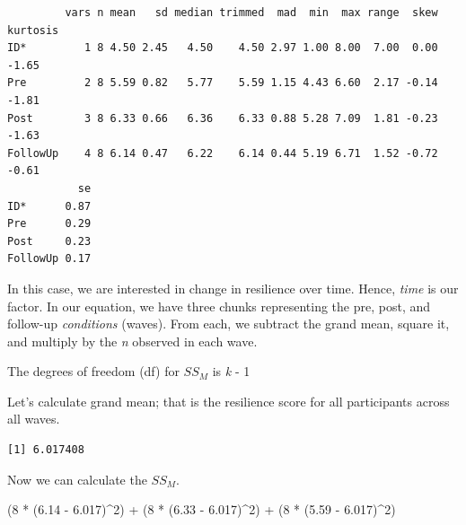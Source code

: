 \documentclass[
  11pt,
]{book}
\newenvironment{Shaded}{\begin{snugshade}}{\end{snugshade}}
\newcommand{\DecValTok}[1]{\textcolor[rgb]{0.00,0.00,0.81}{#1}}
\newcommand{\FloatTok}[1]{\textcolor[rgb]{0.00,0.00,0.81}{#1}}
\newcommand{\FunctionTok}[1]{\textcolor[rgb]{0.00,0.00,0.00}{#1}}
\newcommand{\NormalTok}[1]{#1}
\newcommand{\SpecialCharTok}[1]{\textcolor[rgb]{0.00,0.00,0.00}{#1}}
\begin{document}
\begin{verbatim}
         vars n mean   sd median trimmed  mad  min  max range  skew kurtosis
ID*         1 8 4.50 2.45   4.50    4.50 2.97 1.00 8.00  7.00  0.00    -1.65
Pre         2 8 5.59 0.82   5.77    5.59 1.15 4.43 6.60  2.17 -0.14    -1.81
Post        3 8 6.33 0.66   6.36    6.33 0.88 5.28 7.09  1.81 -0.23    -1.63
FollowUp    4 8 6.14 0.47   6.22    6.14 0.44 5.19 6.71  1.52 -0.72    -0.61
           se
ID*      0.87
Pre      0.29
Post     0.23
FollowUp 0.17
\end{verbatim}

In this case, we are interested in change in resilience over time. Hence, \emph{time} is our factor. In our equation, we have three chunks representing the pre, post, and follow-up \emph{conditions} (waves). From each, we subtract the grand mean, square it, and multiply by the \emph{n} observed in each wave.

The degrees of freedom (df) for \(SS_M\) is \emph{k} - 1

Let's calculate grand mean; that is the resilience score for all participants across all waves.

\begin{Shaded}
\end{Shaded}

\begin{verbatim}
[1] 6.017408
\end{verbatim}

Now we can calculate the \(SS_M\).

\begin{Shaded}
\begin{Highlighting}[]
\NormalTok{(}\DecValTok{8} \SpecialCharTok{*}\NormalTok{ (}\FloatTok{6.14} \SpecialCharTok{{-}} \FloatTok{6.017}\NormalTok{)}\SpecialCharTok{\^{}}\DecValTok{2}\NormalTok{) }\SpecialCharTok{+}\NormalTok{ (}\DecValTok{8} \SpecialCharTok{*}\NormalTok{ (}\FloatTok{6.33} \SpecialCharTok{{-}} \FloatTok{6.017}\NormalTok{)}\SpecialCharTok{\^{}}\DecValTok{2}\NormalTok{) }\SpecialCharTok{+}\NormalTok{ (}\DecValTok{8} \SpecialCharTok{*}\NormalTok{ (}\FloatTok{5.59} \SpecialCharTok{{-}} \FloatTok{6.017}\NormalTok{)}\SpecialCharTok{\^{}}\DecValTok{2}\NormalTok{)}
\end{Highlighting}
\end{Shaded}
\end{document}
